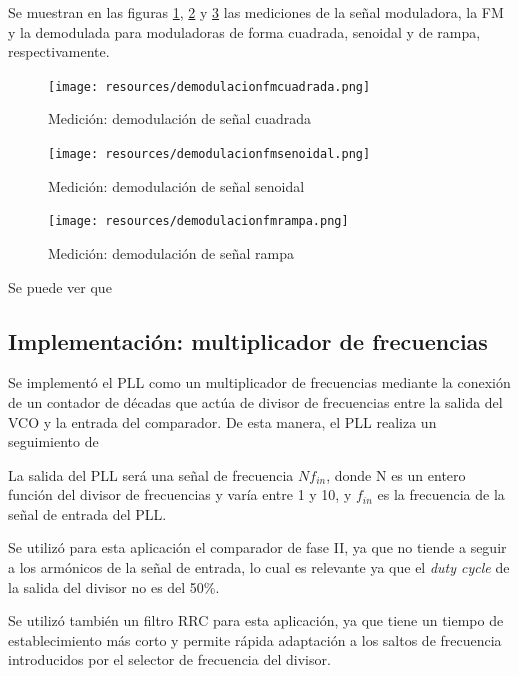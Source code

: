 \documentclass{article}
\begin{document}
Se muestran en las figuras \ref{demodulacionfmcuadrada}, \ref{demodulacionfmsenoidal} y \ref{demodulacionfmrampa} las mediciones de la señal moduladora, la FM y la demodulada para moduladoras de forma cuadrada, senoidal y de rampa, respectivamente. 
\begin{figure}[H]
    \centering
    \texttt{[image: resources/demodulacionfmcuadrada.png]}
    \caption{Medición: demodulación de señal cuadrada}
    \label{demodulacionfmcuadrada}
\end{figure}
\begin{figure}[H]
    \centering
    \texttt{[image: resources/demodulacionfmsenoidal.png]}
    \caption{Medición: demodulación de señal senoidal}
    \label{demodulacionfmsenoidal}
\end{figure}
\begin{figure}[H]
    \centering
    \texttt{[image: resources/demodulacionfmrampa.png]}
    \caption{Medición: demodulación de señal rampa}
    \label{demodulacionfmrampa}
\end{figure}
Se puede ver que %

\subsection{Implementación: multiplicador de frecuencias}
Se implementó el PLL como un multiplicador de frecuencias mediante la conexión de un contador de décadas que actúa de divisor de frecuencias entre la salida del VCO y la entrada del comparador. De esta manera, el PLL realiza un seguimiento de  %

La salida del PLL será una señal de frecuencia $Nf_{in}$, donde N es un entero función del divisor de frecuencias y varía entre 1 y 10, y $f_{in}$ es la frecuencia de la señal de entrada del PLL.

Se utilizó para esta aplicación el comparador de fase II, ya que no tiende a seguir a los armónicos de la señal de entrada, lo cual es relevante ya que el \emph{duty cycle} de la salida del divisor no es del 50\%.

Se utilizó también un filtro RRC para esta aplicación, ya que tiene un tiempo de establecimiento más corto y permite rápida adaptación a los saltos de frecuencia introducidos por el selector de frecuencia del divisor. %
\end{document}
